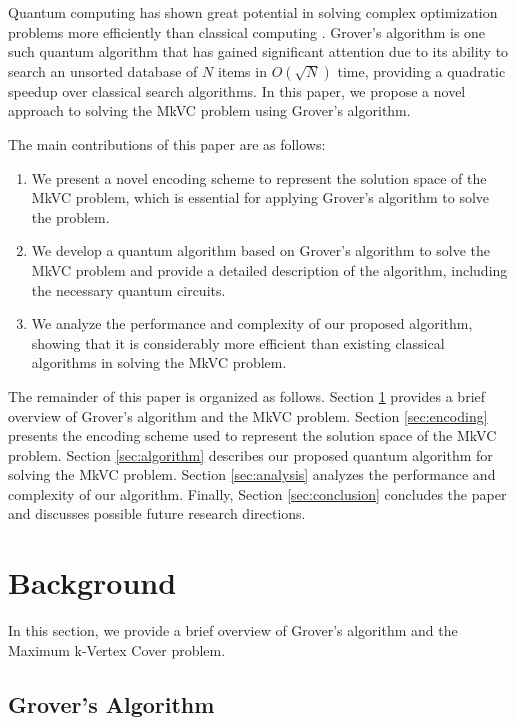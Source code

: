 Quantum computing has shown great potential in solving complex optimization problems more efficiently than classical computing \cite{nielsen2002quantum}. Grover's algorithm \cite{grover1996fast} is one such quantum algorithm that has gained significant attention due to its ability to search an unsorted database of $N$ items in $O(\sqrt{N})$ time, providing a quadratic speedup over classical search algorithms. In this paper, we propose a novel approach to solving the MkVC problem using Grover's algorithm.

The main contributions of this paper are as follows:
\begin{enumerate}
    \item We present a novel encoding scheme to represent the solution space of the MkVC problem, which is essential for applying Grover's algorithm to solve the problem.
    \item We develop a quantum algorithm based on Grover's algorithm to solve the MkVC problem and provide a detailed description of the algorithm, including the necessary quantum circuits.
    \item We analyze the performance and complexity of our proposed algorithm, showing that it is considerably more efficient than existing classical algorithms in solving the MkVC problem.
\end{enumerate}

The remainder of this paper is organized as follows. Section \ref{sec:background} provides a brief overview of Grover's algorithm and the MkVC problem. Section \ref{sec:encoding} presents the encoding scheme used to represent the solution space of the MkVC problem. Section \ref{sec:algorithm} describes our proposed quantum algorithm for solving the MkVC problem. Section \ref{sec:analysis} analyzes the performance and complexity of our algorithm. Finally, Section \ref{sec:conclusion} concludes the paper and discusses possible future research directions.

\section{Background}
\label{sec:background}

In this section, we provide a brief overview of Grover's algorithm and the Maximum k-Vertex Cover problem.

\subsection{Grover's Algorithm}
\label{subsec:grover}

